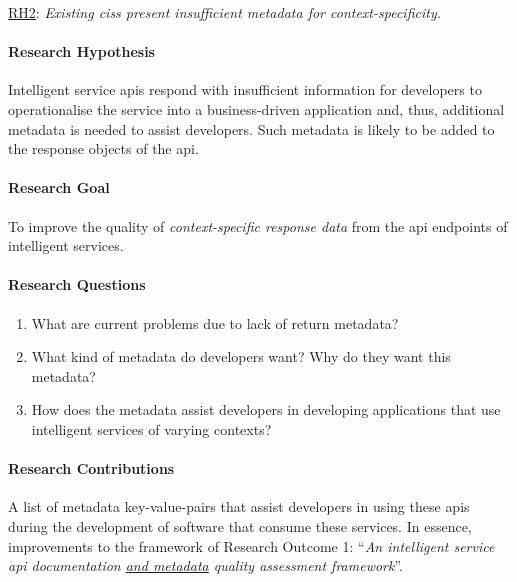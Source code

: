 \begin{titled-frame}{\underline{RH2}: \textit{Existing \glspl{cis} present insufficient metadata for context-specificity.} }
\vspace{-12pt}
\paragraph{Research Hypothesis}
Intelligent service \glspl{api} respond with insufficient information for developers to operationalise the service into a business-driven application and, thus, additional metadata is needed to assist developers. Such metadata is likely to be added to the response objects of the \gls{api}.

\paragraph{Research Goal}
To improve the quality of \textit{context-specific response data} from the \gls{api} endpoints of intelligent services.

\paragraph{Research Questions}
\begin{enumerate}[label=\textbf{RQ2.\arabic*.}, ref=RQ2.\arabic*, leftmargin=3.5\parindent, rightmargin=1\parindent]
  \item What are current problems due to lack of return metadata?
  \label{rqs:metadata:what-problems-due-to-lack-of-metadata}
  
  \item What kind of metadata do developers want? Why do they want this metadata?
  \label{rqs:metadata:what-metadata-do-devs-want-and-why}
  
  \item How does the metadata assist developers in developing applications that use intelligent services of varying contexts?
  \label{rqs:metadata:how-does-metadata-assist-devs}
\end{enumerate}

\paragraph{Research Contributions} A list of metadata key-value-pairs that assist developers in using these \glspl{api} during the development of software that consume these services. In essence, improvements to the framework of Research Outcome 1: ``\textit{An intelligent service \gls{api} documentation \underline{\upshape and metadata} quality assessment framework}''.


\end{titled-frame}
